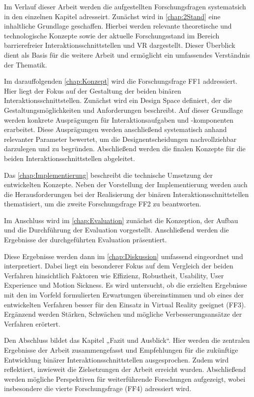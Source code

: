 Im Verlauf dieser Arbeit werden die aufgestellten Forschungsfragen systematsich in den einzelnen Kapitel adresseirt. Zunächst wird in \autoref{chap:2Stand} eine inhaltliche Grundlage geschaffen. Hierbei werden relevante theoretische und technologische Konzepte sowie der aktuelle Forschungsstand im Bereich barrierefreier Interaktionsschnittstellen und VR dargestellt. Dieser Überblick dient als Basis für die weitere Arbeit und ermöglicht ein umfassendes Verständnis der Thematik.

Im darauffolgenden \autoref{chap:Konzept} wird die Forschungsfrage FF1 addressiert. Hier liegt der Fokus auf der Gestaltung der beiden binären Interaktionsschnittstellen. Zunächst wird ein Design Space definiert, der die Gestaltungsmöglichkeiten und Anforderungen beschreibt. Auf dieser Grundlage werden konkrete Ausprägungen für Interaktionsaufgaben und -komponenten erarbeitet. Diese Ausprägungen werden anschließend systematisch anhand relevanter Parameter bewertet, um die Designentscheidungen nachvollziehbar darzulegen und zu begründen. Abschließend werden die finalen Konzepte für die beiden Interaktionsschnittstellen abgeleitet.

Das \autoref{chap:Implementierung} beschreibt die technische Umsetzung der entwickelten Konzepte. Neben der Vorstellung der Implementierung werden auch die Herausforderungen bei der Realisierung der binären Interaktionsschnittstellen thematisiert, um die zweite Forschungsfrage FF2 zu beantworten.

Im Anschluss wird im \autoref{chap:Evaluation} zunächst die Konzeption, der Aufbau und die Durchführung der Evaluation vorgestellt. Anschließend werden die Ergebnisse der durchgeführten Evaluation präsentiert.

Diese Ergebnisse werden dann im \autoref{chap:Diskussion} umfassend eingeordnet und interpretiert. Dabei liegt ein besonderer Fokus auf dem Vergleich der beiden Verfahren hinsichtlich Faktoren wie Effizienz, Robustheit, Usability, User Experience und Motion Sickness. Es wird untersucht, ob die erzielten Ergebnisse mit den im Vorfeld formulierten Erwartungen übereinstimmen und ob eines der entwickelten Verfahren besser für den Einsatz in Virtual Reality geeignet (FF3). Ergänzend werden Stärken, Schwächen und mögliche Verbesserungsansätze der Verfahren erörtert.

Den Abschluss bildet das Kapitel „Fazit und Ausblick“. Hier werden die zentralen Ergebnisse der Arbeit zusammengefasst und Empfehlungen für die zukünftige Entwicklung binärer Interaktionsschnittstellen ausgesprochen. Zudem wird reflektiert, inwieweit die Zielsetzungen der Arbeit erreicht wurden. Abschließend werden mögliche Perspektiven für weiterführende Forschungen aufgezeigt, wobei insbesondere die vierte Forschungsfrage (FF4) adressiert wird.
